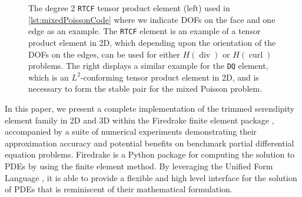 \documentclass[format=acmsmall,screen,timestamp=false,a4paper]{acmart}
\DeclareMathOperator{\Div}{div}
\DeclareMathOperator{\curl}{curl}
\newcommand{\hcurl}{\ensuremath{{H}(\curl)}\xspace}
\newcommand{\hdiv}{\ensuremath{{H}(\Div)}\xspace}
\begin{document}
\begin{figure}[htbp]
\caption{The degree 2 \texttt{RTCF} tensor product element \cite{raviart1977mixed} (left) used in \cref{lst:mixedPoissonCode} where we indicate DOFs on the face and one edge as an example.  The \texttt{RTCF} element is an example of a tensor product element in 2D, which depending upon the orientation of the DOFs on the edges, can be used for either \hdiv or \hcurl problems.  The right displays a similar example for the \texttt{DQ} element, which is an $L^2$-conforming tensor product element in 2D, and is necessary to form the stable pair for the mixed Poisson problem.\label{fig:RTCF}}
\end{figure}
  
In this paper, we present a complete implementation of the trimmed serendipity element family in 2D and 3D within the Firedrake finite element package \cite{rathgeber2016firedrake}, accompanied by a suite of numerical experiments demonstrating their approximation accuracy and potential benefits on benchmark partial differential equation problems.
Firedrake is a Python package for computing the solution to PDEs by using the finite element method.  By leveraging the Unified Form Language \cite{Logg:2012,alnaes2014unified}, it is able to provide a flexible and high level interface for the solution of PDEs that is reminiscent of their mathematical formulation.
\end{document}
